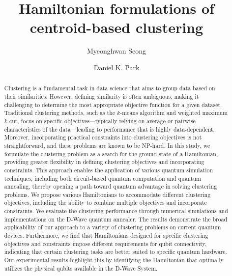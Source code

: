\documentclass[showpacs,twocolumn,superscriptaddress]{revtex4-2}
\begin{document}
\title{Hamiltonian formulations of centroid-based clustering}

\author{Myeonghwan Seong}
\author{Daniel K. Park}

\begin{abstract}
    Clustering is a fundamental task in data science that aims to group data based on their similarities. However, defining similarity is often ambiguous, making it challenging to determine the most appropriate objective function for a given dataset. Traditional clustering methods, such as the $k$-means algorithm and weighted maximum $k$-cut, focus on specific objectives---typically relying on average or pairwise characteristics of the data---leading to performance that is highly data-dependent. Moreover, incorporating practical constraints into clustering objectives is not straightforward, and these problems are known to be NP-hard. In this study, we formulate the clustering problem as a search for the ground state of a Hamiltonian, providing greater flexibility in defining clustering objectives and incorporating constraints. This approach enables the application of various quantum simulation techniques, including both circuit-based quantum computation and quantum annealing, thereby opening a path toward quantum advantage in solving clustering problems. We propose various Hamiltonians to accommodate different clustering objectives, including the ability to combine multiple objectives and incorporate constraints. We evaluate the clustering performance through numerical simulations and implementations on the D-Wave quantum annealer. The results demonstrate the broad applicability of our approach to a variety of clustering problems on current quantum devices. Furthermore, we find that Hamiltonians designed for specific clustering objectives and constraints impose different requirements for qubit connectivity, indicating that certain clustering tasks are better suited to specific quantum hardware. Our experimental results highlight this by identifying the Hamiltonian that optimally utilizes the physical qubits available in the D-Wave System. 
\end{abstract}

\maketitle
\def\one{{\mathchoice {\rm 1\mskip-4mu l} {\rm 1\mskip-4mu l} {\rm\mskip-4.5mu l} {\rm 1\mskip-5mu l}}}
\end{document}
